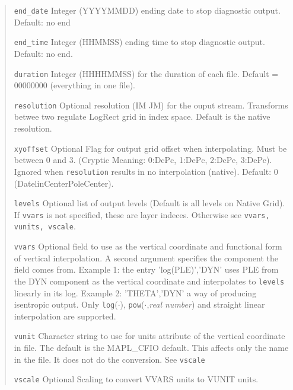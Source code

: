 \begin{quote}
\begin{trivlist}
\item[\tt end\_date]     Integer (YYYYMMDD) ending date to stop diagnostic output.
                         Default: no end
\item[\tt end\_time]     Integer (HHMMSS) ending time to stop diagnostic output.
                         Default: no end.
\item[\tt duration]      Integer (HHHHMMSS) for the duration of each file. 
                         Default = 00000000 (everything in one file).
\item[\tt resolution]    Optional resolution (IM JM) for the ouput stream.
                         Transforms betwee two regulate LogRect grid in index space. 
                         Default is the native resolution.
\item[\tt xyoffset]      Optional Flag for output grid offset when interpolating. Must be
                         between 0 and 3. (Cryptic Meaning: 0:DcPc, 1:DePc, 2:DcPe, 3:DePe).
                         Ignored when {\tt resolution} results in no interpolation (native).
                         Default: 0 (DatelinCenterPoleCenter). 
\item[\tt levels]        Optional list of output levels (Default is all levels on Native Grid).
                         If {\tt vvars} is not specified, these are layer indeces. Otherwise
                         see {\tt vvars, vunits, vscale}.
\item[\tt vvars]         Optional field to use as the vertical coordinate and functional form
                         of vertical interpolation. A second argument specifies 
                         the component the field comes from. 
                         Example 1: the entry 'log(PLE)','DYN' uses PLE from the
                         DYN component as the vertical coordinate and interpolates
                         to {\tt levels} linearly in its log. Example 2: 'THETA','DYN'
                         a way of producing isentropic output.
                         Only {\tt log}($\cdot$), {\tt pow}($\cdot$,{\em real number})
                         and straight linear interpolation are supported.
\item[\tt vunit]         Character string to use for units attribute of the vertical 
                         coordinate in file. 
                         The default is the MAPL\_CFIO default. 
                         This affects only the name in the file.
                         It does not do the conversion. See {\tt vscale}
\item[\tt vscale]        Optional Scaling to convert VVARS units to VUNIT units.

\end{trivlist}
\end{quote}
